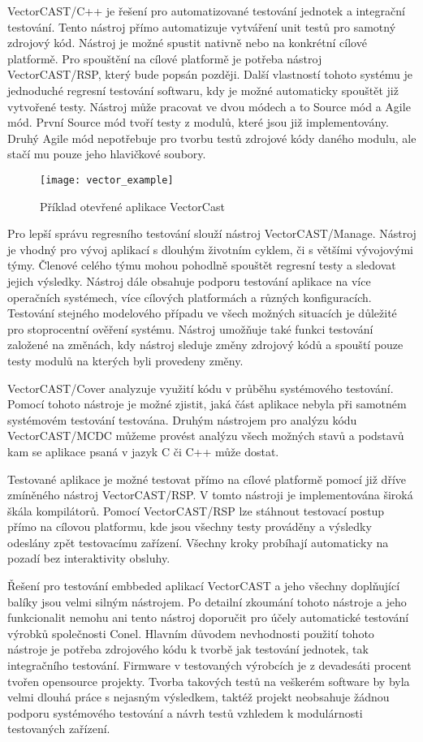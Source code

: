 VectorCAST/C++ je řešení pro automatizované testování jednotek a integrační testování. Tento nástroj přímo automatizuje vytváření unit testů pro samotný zdrojový kód. Nástroj je možné spustit nativně nebo na konkrétní cílové platformě. Pro spouštění na cílové platformě je potřeba nástroj VectorCAST/RSP, který bude popsán později. Další vlastností tohoto systému je jednoduché regresní testování softwaru, kdy je možné automaticky spouštět již vytvořené testy. Nástroj může pracovat ve dvou módech a to Source mód a Agile mód. První Source mód tvoří testy z modulů, které jsou již implementovány. Druhý Agile mód nepotřebuje pro tvorbu testů zdrojové kódy daného modulu, ale stačí mu pouze jeho hlavičkové soubory.

\begin{figure}[h]
  \centering
  \texttt{[image: vector\_example]}
  \caption{Příklad otevřené aplikace VectorCast}
  \label{fig:vector_example}
\end{figure}

Pro lepší správu regresního testování slouží nástroj VectorCAST/Manage. Nástroj je vhodný pro vývoj aplikací s dlouhým životním cyklem, či s většími vývojovými týmy. Členové celého týmu mohou pohodlně spouštět regresní testy a sledovat jejich výsledky. Nástroj dále obsahuje podporu testování aplikace na více operačních systémech, více cílových platformách a různých konfiguracích. Testování stejného modelového případu ve všech možných situacích je důležité pro stoprocentní ověření systému. Nástroj umožňuje také funkci testování založené na změnách, kdy nástroj sleduje změny zdrojový kódů a spouští pouze testy modulů na kterých byli provedeny změny.

VectorCAST/Cover analyzuje využití kódu v průběhu systémového testování. Pomocí tohoto nástroje je možné zjistit, jaká část aplikace nebyla při samotném systémovém testování testována. Druhým nástrojem pro analýzu kódu VectorCAST/MCDC můžeme provést analýzu všech možných stavů a podstavů kam se aplikace psaná v jazyk C či C++ může dostat.

Testované aplikace je možné testovat přímo na cílové platformě pomocí již dříve zmíněného nástroj VectorCAST/RSP. V tomto nástroji je implementována široká škála kompilátorů. Pomocí VectorCAST/RSP lze stáhnout testovací postup přímo na cílovou platformu, kde jsou všechny testy prováděny a výsledky odeslány zpět testovacímu zařízení. Všechny kroky probíhají automaticky na pozadí bez interaktivity obsluhy.

Řešení pro testování embbeded aplikací VectorCAST a jeho všechny doplňující balíky jsou velmi silným nástrojem. Po detailní zkoumání tohoto nástroje a jeho funkcionalit nemohu ani tento nástroj doporučit pro účely automatické testování výrobků společnosti Conel. Hlavním důvodem nevhodnosti použití tohoto nástroje je potřeba zdrojového kódu k tvorbě jak testování jednotek, tak integračního testování. Firmware v testovaných výrobcích je z devadesáti procent tvořen opensource projekty. Tvorba takových testů na veškerém software by byla velmi dlouhá práce s nejasným výsledkem, taktéž projekt neobsahuje žádnou podporu systémového testování a návrh testů vzhledem k modulárnosti testovaných zařízení.

